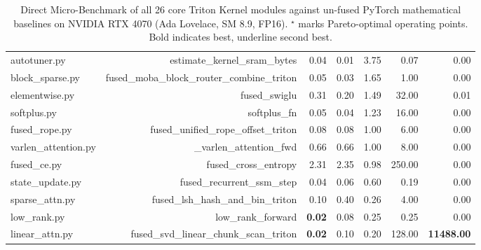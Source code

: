 \begin{table}[t]
\begin{tabular}{lrrrrrr}
autotuner.py & estimate\_kernel\_sram\_bytes & 0.04 & 0.01 & 3.75 & 0.07 & 0.00 \\
block\_sparse.py & fused\_moba\_block\_router\_combine\_triton & 0.05 & 0.03 & 1.65 & 1.00 & 0.00 \\
elementwise.py & fused\_swiglu & 0.31 & 0.20 & 1.49 & 32.00 & 0.01 \\
softplus.py & softplus\_fn & 0.05 & 0.04 & 1.23 & 16.00 & 0.00 \\
fused\_rope.py & fused\_unified\_rope\_offset\_triton & 0.08 & 0.08 & 1.00 & 6.00 & 0.00 \\
varlen\_attention.py & \_varlen\_attention\_fwd & 0.66 & 0.66 & 1.00 & 8.00 & 0.00 \\
fused\_ce.py & fused\_cross\_entropy & 2.31 & 2.35 & 0.98 & 250.00 & 0.00 \\
state\_update.py & fused\_recurrent\_ssm\_step & 0.04 & 0.06 & 0.60 & 0.19 & 0.00 \\
sparse\_attn.py & fused\_lsh\_hash\_and\_bin\_triton & 0.10 & 0.40 & 0.26 & 4.00 & 0.00 \\
low\_rank.py & low\_rank\_forward & \textbf{0.02} & 0.08 & 0.25 & 0.25 & 0.00 \\
linear\_attn.py & fused\_svd\_linear\_chunk\_scan\_triton & \textbf{0.02} & 0.10 & 0.20 & 128.00 & \textbf{11488.00} \\
\bottomrule
\end{tabular}
\caption{Direct Micro-Benchmark of all 26 core Triton Kernel modules against un-fused PyTorch mathematical baselines on NVIDIA RTX 4070 (Ada Lovelace, SM 8.9, FP16). $^\star$ marks Pareto-optimal operating points. Bold indicates best, underline second best.}
\label{tab:core_triton_kernels}
\end{table}

